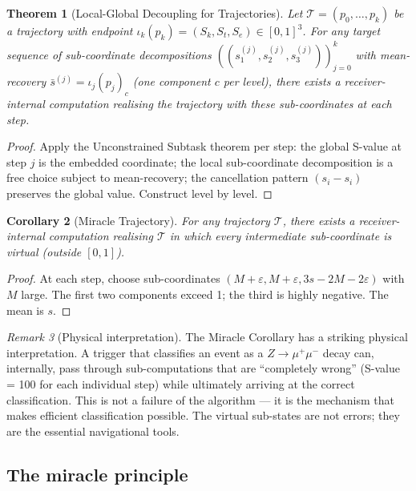 \documentclass[twocolumn,10pt,a4paper]{article}
\theoremstyle{thmstyle}
\newtheorem{theorem}{Theorem}[section]
\newtheorem{corollary}[theorem]{Corollary}
\theoremstyle{definition}
\theoremstyle{remark}
\newtheorem{remark}[theorem]{Remark}
\newcommand{\Sk}{S_{k}}
\newcommand{\St}{S_{t}}
\newcommand{\Se}{S_{e}}
\begin{document}
\begin{theorem}[Local-Global Decoupling for Trajectories]
\label{thm:local_global}
Let $\mathcal{T} = (p_0, \ldots, p_k)$ be a trajectory with endpoint
$\iota_k(p_k) = (\Sk, \St, \Se) \in [0,1]^3$.
For any target sequence of sub-coordinate decompositions
$((s_1^{(j)}, s_2^{(j)}, s_3^{(j)}))_{j=0}^k$
with mean-recovery $\bar s^{(j)} = \iota_j(p_j)_c$ (one component $c$
per level), there exists a receiver-internal computation realising
the trajectory with these sub-coordinates at each step.
\end{theorem}

\begin{proof}
Apply the Unconstrained Subtask theorem \citep{companion:recursion}
per step: the global S-value at step $j$ is the embedded coordinate;
the local sub-coordinate decomposition is a free choice subject to
mean-recovery; the cancellation pattern $(s_i - s_i)$ preserves the
global value. Construct level by level.
\end{proof}

\begin{corollary}[Miracle Trajectory]
\label{cor:miracle}
For any trajectory $\mathcal{T}$, there exists a receiver-internal
computation realising $\mathcal{T}$ in which \emph{every} intermediate
sub-coordinate is virtual (outside $[0,1]$).
\end{corollary}

\begin{proof}
At each step, choose sub-coordinates $(M+\varepsilon, M+\varepsilon,
3s - 2M - 2\varepsilon)$ with $M$ large. The first two components
exceed 1; the third is highly negative. The mean is $s$.
\end{proof}

\begin{remark}[Physical interpretation]
The Miracle Corollary has a striking physical interpretation.
A trigger that classifies an event as a $Z \to \mu^+\mu^-$ decay
can, internally, pass through sub-computations that are ``completely wrong''
(S-value = 100 for each individual step) while ultimately arriving
at the correct classification. This is not a failure of the algorithm —
it is the mechanism that makes efficient classification possible.
The virtual sub-states are not errors; they are the essential navigational
tools.
\end{remark}

\subsection{The miracle principle}
\end{document}
